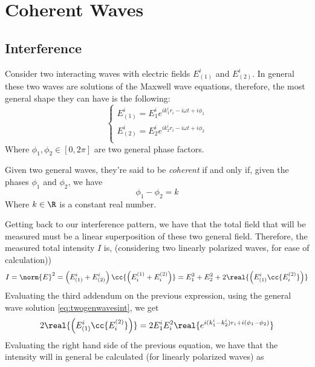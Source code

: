 \documentclass[../electromagnetism.tex]{subfiles}
\begin{document}
\section{Coherent Waves}
\subsection{Interference}
Consider two interacting waves with electric fields $E_{(1)}^i$ and $E_{(2)}^i$. In general these two waves are solutions of the Maxwell wave equations, therefore, the most general shape they can have is the following:
\begin{equation}
	\left\{ \begin{aligned}
			E_{(1)}^i=E_1^ie^{ik_1^ir_i-i\omega t+i\phi_1}\\
			E_{(2)}^i=E_2^ie^{ik_2^ir_i-i\omega t+i\phi_2}\\
	\end{aligned}\right.
	\label{eq:twogenwavesint}
\end{equation}
Where $\phi_1,\phi_2\in[0,2\pi]$ are two general phase factors.\\
\begin{dfn}
	Given two general waves, they're said to be \emph{coherent} if and only if, given the phases $\phi_1$ and $\phi_2$, we have
	\begin{equation}
		\phi_1-\phi_2=k
		\label{eq:coherencedef}
	\end{equation}
	Where $k\in\R$ is a constant real number.
\end{dfn}
Getting back to our interference pattern, we have that the total field that will be measured must be a linear superposition of these two general field. Therefore, the measured total intensity $I$ is, (considering two linearly polarized waves, for ease of calculation))
\begin{equation*}
	I=\norm{E}^2=\left( E_{(1)}^i+E_{(2)}^i \right)\cc{\left( E^{(1)}_i+E^{(2)}_i \right)}=E_1^2+E_2^2+2\real{\left(E_{(1)}^i\cc{E^{(2)}_i}\right)}
\end{equation*}
Evaluating the third addendum on the previous expression, using the general wave solution \eqref{eq:twogenwavesint}, we get
\begin{equation*}
	2\real{\left(E_{(1)}^i\cc{E_i^{(2)}}\right)}=2E^i_1E_i^2\real{e^{i(k_1^i-k_2^i)r_i+i(\phi_1-\phi_2)}}
\end{equation*}
Evaluating the right hand side of the previous equation, we have that the intensity will in general be calculated (for linearly polarized waves) as
\end{document}
